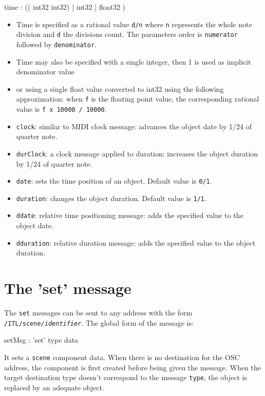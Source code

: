 \documentclass[a4paper,twoside]{report}
\newcommand{\toplevel}[1]	{\chapter{#1}}
\newcommand{\OSC}[1]		{\texttt{#1}}
\newcommand{\values}[1]	{\texttt{#1}}
\begin{document}
\begin{rail}
time : (( int32 int32) | int32 | float32 )
\end{rail}

\begin{itemize}
\item Time is specified as a rational value \values{d/n} where \values{n} represents the whole note division and \values{d} the divisions count. The parameters order is \values{numerator} followed by \values{denominator}. 
\item Time may also be specified with a single integer, then 1 is used as implicit denominator value
\item or using a single float value converted to int32 using the following approximation: when \values{f} is the floating point value, the corresponding rational value is \values{f x 10000 / 10000}.
\end{itemize}

\begin{itemize}
\item \OSC{clock}: similar to MIDI clock message: advances the object date by 1/24 of quarter note.
\item \OSC{durClock}: a clock message applied to duration: increases the object duration by 1/24 of quarter note.
\item \OSC{date}: sets the time position of an object. Default value is \values{0/1}.
\item \OSC{duration}: changes the object duration. Default value is \values{1/1}.
\item \OSC{ddate}: relative time positioning message: adds the specified value to the object date.
\item \OSC{dduration}: relative duration message: adds the specified value to the object duration.
\end{itemize}


\toplevel{The 'set' message}
\label{setsect}
The \OSC{set} messages can be sent to any address with the form \OSC{/ITL/scene/\textit{identifier}}. The global form of the message is:

\begin{rail}
setMsg : 'set' type data
\end{rail}

It sets a \OSC{scene} component data. When there is no destination for the OSC address, the component is first created before being given the message. When the target destination type doesn't correspond to the message \OSC{type}, the object is replaced by an adequate object.
\end{document}

